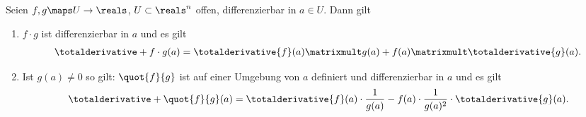 \begin{satz}
    Seien \( f,g\maps U\to \reals \), \( U\subset \reals^n \) offen, differenzierbar in \( a\in U \). Dann gilt
    \begin{enumerate}
        \item \label{produktregel} \( f\cdot g \) ist differenzierbar in \( a \) und es gilt
        \begin{align*}
            \totalderivative+{f\cdot g}(a)=\totalderivative{f}(a)\matrixmult g(a)+f(a)\matrixmult \totalderivative{g}(a).
        \end{align*}
        \item \label{quotientenregel} Ist \( g(a)\neq 0 \) so gilt: \( \quot{f}{g} \) ist auf einer Umgebung von \( a \) definiert und differenzierbar in \( a \) und es gilt 
        \begin{align*}
            \totalderivative+{\quot{f}{g}}(a)=\totalderivative{f}(a)\cdot\frac{1}{g(a)}-f(a)\cdot\frac{1}{g(a)^2}\cdot \totalderivative{g}(a).
        \end{align*}
    \end{enumerate}
    
\end{satz}
